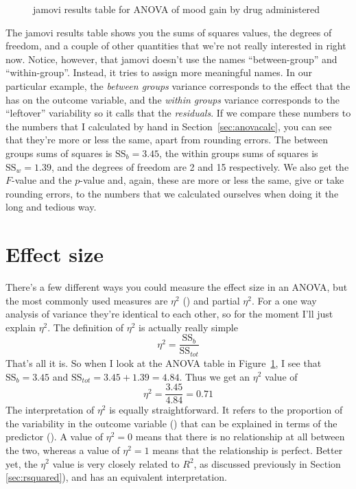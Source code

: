 \begin{figure}[htb]
\begin{center}
\caption{jamovi results table for ANOVA of mood gain by drug administered}
\HR
\label{fig:anova2}
\end{center}
\end{figure}

The jamovi results table shows you the sums of squares values, the degrees of freedom, and a couple of other quantities that we're not really interested in right now. Notice, however, that jamovi doesn't use the names ``between-group'' and ``within-group''. Instead, it tries to assign more meaningful names. In our particular example, the {\it between groups} variance corresponds to the effect that the  has on the outcome variable, and the {\it within groups} variance corresponds to the ``leftover'' variability so it calls that the {\it residuals}. If we compare these numbers to the numbers that I calculated by hand in Section~\ref{sec:anovacalc}, you can see that they're more or less the same, apart from rounding errors. The between groups sums of squares is $\mbox{SS}_b = 3.45$, the within groups sums of squares is $\mbox{SS}_w = 1.39$, and the degrees of freedom are 2 and 15 respectively. We also get the $F$-value and the $p$-value and, again, these are more or less the same, give or take rounding errors, to the numbers that we calculated ourselves when doing it the long and tedious way. 


\section{Effect size\label{sec:etasquared}}

There's a few different ways you could measure the effect size in an ANOVA, but the most commonly used measures are $\eta^2$ () and partial $\eta^2$. For a one way analysis of variance they're identical to each other, so for the moment I'll just explain $\eta^2$. The definition of $\eta^2$ is actually really simple
$$
\eta^2 = \frac{\mbox{SS}_b}{\mbox{SS}_{tot}}
$$
That's all it is. So when I look at the ANOVA table in Figure~\ref{fig:anova2}, I see that $\mbox{SS}_b = 3.45$  and $\mbox{SS}_{tot} = 3.45 + 1.39 = 4.84$. Thus we get an $\eta^2$ value of 
$$
\eta^2 = \frac{3.45}{4.84} = 0.71
$$
The interpretation of $\eta^2$ is equally straightforward. It refers to the proportion of the variability in the outcome variable () that can be explained in terms of the predictor (). A value of $\eta^2 = 0$ means that there is no relationship at all between the two, whereas a value of $\eta^2 = 1$ means that the relationship is perfect. Better yet, the $\eta^2$ value is very closely related to $R^2$, as discussed previously in Section \ref{sec:rsquared}), and has an equivalent interpretation.

